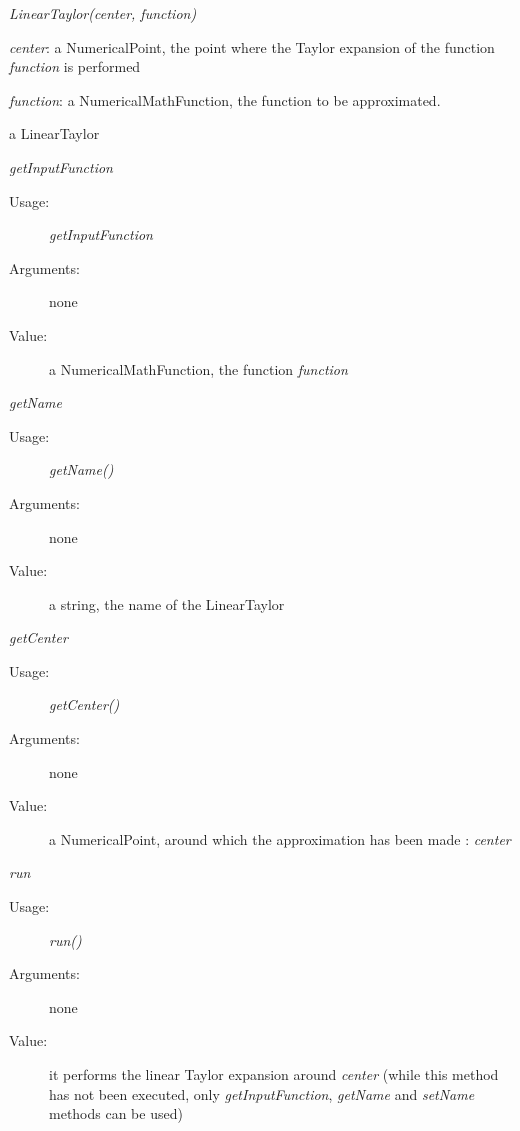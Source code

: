 \begin{description}

\item[Usage:] \textit{LinearTaylor(center, function)}
\bigskip

\item[Arguments:]  \rule{0pt}{1em}
\begin{description}
\item \textit{center}: a NumericalPoint, the point where the Taylor expansion of the function \textit{function} is performed
\item \textit{function}: a NumericalMathFunction, the function to be approximated.
\end{description}

\item[Value:] a LinearTaylor

\item[Some methods :]  \rule{0pt}{1em}
\begin{description}

\item \textit{getInputFunction}
\begin{description}
\item[Usage:] \textit{getInputFunction}
\item[Arguments:] none
\item[Value:] a NumericalMathFunction, the function \textit{function}
\end{description}
\bigskip

\item \textit{getName}
\begin{description}
\item[Usage:] \textit{getName()}
\item[Arguments:] none
\item[Value:] a string, the name of the LinearTaylor
\end{description}
\bigskip

\item \textit{getCenter}
\begin{description}
\item[Usage:] \textit{getCenter()}
\item[Arguments:] none
\item[Value:] a NumericalPoint, around which the approximation has been made : \textit{center}
\end{description}
\bigskip

\item \textit{run}
\begin{description}
\item[Usage:] \textit{run()}
\item[Arguments:] none
\item[Value:] it performs the linear Taylor expansion around \textit{center}
(while this method has not been executed, only
\textit{getInputFunction}, \textit{getName} and \textit{setName} methods can be used)
\end{description}
\bigskip


\end{description}
\end{description}
